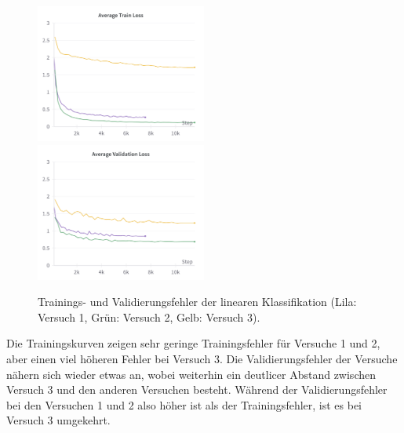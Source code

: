 \begin{figure}[h]
	\centering
	\includegraphics[width=0.5\textwidth]{figure_results_supcon-lin_avg-train-loss.png}%
	\includegraphics[width=0.5\textwidth]{figure_results_supcon-lin_avg-val-loss.png}
	\caption[Trainings- und Validierungsfehler der linearen Klassifikation.]{Trainings- und Validierungsfehler der linearen Klassifikation (\textcolor{exp1}{Lila}: Versuch 1, \textcolor{exp2}{Grün}: Versuch 2, \textcolor{exp3}{Gelb}: Versuch 3).}
	\label{fig:supcon-lin-loss}
\end{figure}

Die Trainingskurven zeigen sehr geringe Trainingsfehler für Versuche 1 und 2, aber einen viel höheren Fehler bei Versuch 3. Die Validierungsfehler der Versuche nähern sich wieder etwas an, wobei weiterhin ein deutlicer Abstand zwischen Versuch 3 und den anderen Versuchen besteht. Während der Validierungsfehler bei den Versuchen 1 und 2 also höher ist als der Trainingsfehler, ist es bei Versuch 3 umgekehrt.

